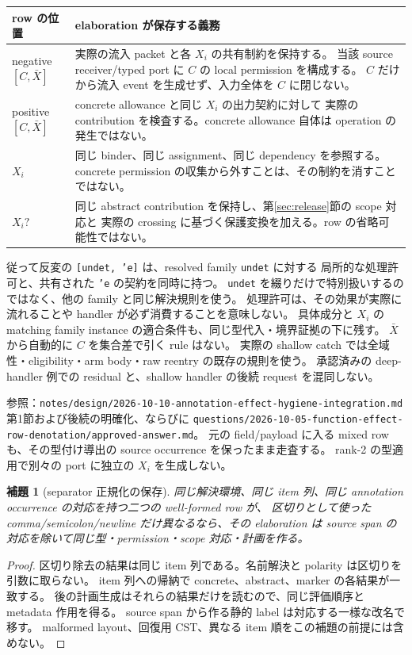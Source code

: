 \documentclass[11pt,a4paper]{article}
\newtheorem{lemma}[definition]{補題}
\begin{document}
\begin{longtable}{p{}p{}}
\toprule row の位置 & elaboration が保存する義務 \\
\midrule\endhead
negative \([C,\bar X]\) & 実際の流入 packet と各 \(X_i\) の共有制約を保持する。
当該 source receiver/typed port に \(C\) の local permission を構成する。
\(C\) だけから流入 event を生成せず、入力全体を \(C\) に閉じない。\\
positive \([C,\bar X]\) & concrete allowance と同じ \(X_i\) の出力契約に対して
実際の contribution を検査する。concrete allowance 自体は operation の発生ではない。\\
\(X_i\) & 同じ binder、同じ assignment、同じ dependency を参照する。
concrete permission の収集から外すことは、その制約を消すことではない。\\
\(X_i?\) & 同じ abstract contribution を保持し、第\ref{sec:release}節の scope 対応と
実際の crossing に基づく保護変換を加える。row の省略可能性ではない。\\
\bottomrule
\end{longtable}

従って反変の \texttt{[undet, 'e]} は、resolved family \texttt{undet} に対する
局所的な処理許可と、共有された \texttt{'e} の契約を同時に持つ。
\texttt{undet} を綴りだけで特別扱いするのではなく、他の family と同じ解決規則を使う。
処理許可は、その効果が実際に流れることや handler が必ず消費することを意味しない。
具体成分と \(X_i\) の matching family instance の適合条件も、同じ型代入・境界証拠の下に残す。
\(\bar X\) から自動的に \(C\) を集合差で引く rule はない。
実際の shallow catch では全域性・eligibility・arm body・raw reentry の既存の規則を使う。
承認済みの deep-handler 例での residual と、shallow handler の後続 request を混同しない。

参照：\nolinkurl{notes/design/2026-10-10-annotation-effect-hygiene-integration.md}
第1節および後続の明確化、ならびに
\nolinkurl{questions/2026-10-05-function-effect-row-denotation/approved-answer.md}。
元の field/payload に入る mixed row も、その型付け導出の source occurrence を保ったまま走査する。
rank-2 の型適用で別々の port に独立の \(X_i\) を生成しない。

\begin{lemma}[separator 正規化の保存]
同じ解決環境、同じ item 列、同じ annotation occurrence の対応を持つ二つの well-formed row が、
区切りとして使った comma/semicolon/newline だけ異なるなら、その elaboration は
source span の対応を除いて同じ型・permission・scope 対応・計画を作る。
\end{lemma}
\begin{proof}
区切り除去の結果は同じ item 列である。名前解決と polarity は区切りを引数に取らない。
item 列への帰納で concrete、abstract、marker の各結果が一致する。
後の計画生成はそれらの結果だけを読むので、同じ評価順序と metadata 作用を得る。
source span から作る静的 label は対応する一様な改名で移す。
malformed layout、回復用 CST、異なる item 順をこの補題の前提には含めない。
\end{proof}
\end{document}
